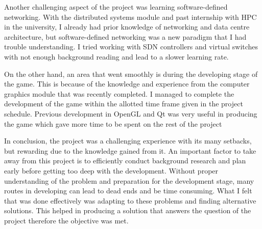 \newline
\par
Another challenging aspect of the project was learning software-defined networking. With the distributed systems module and past internship with HPC in the university, I already had prior knowledge of networking and data centre architecture, but software-defined networking was a new paradigm that I had trouble understanding. I tried working with SDN controllers and virtual switches with not enough background reading and lead to a slower learning rate.
\newline
\par
On the other hand, an area that went smoothly is during the developing stage of the game. This is because of the knowledge and experience from the computer graphics module that was recently completed. I managed to complete the development of the game within the allotted time frame given in the project schedule. Previous development in OpenGL and Qt was very useful in producing the game which gave more time to be spent on the rest of the project
\newline
\par
In conclusion, the project was a challenging experience with its many setbacks, but rewarding due to the knowledge gained from it. An important factor to take away from this project is to efficiently conduct background research and plan early before getting too deep with the development. Without proper understanding of the problem and preparation for the development stage, many routes in developing can lead to dead ends and be time consuming. What I felt that was done effectively was adapting to these problems and finding alternative solutions. This helped in producing a solution that answers the question of the project therefore the objective was met.